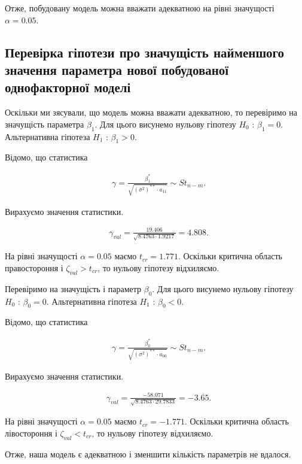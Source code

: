 \documentclass[14pt,a4paper]{scrartcl}
\theoremstyle{definition}
\theoremstyle{remark}
\theoremstyle{definition}
\theoremstyle{definition}
\begin{document}
Отже, побудовану модель можна вважати адекватною на рівні значущості $\alpha = 0.05$.

\subsection{Перевірка гіпотези про значущість найменшого значення параметра нової побудованої однофакторної моделі}

Оскільки ми з\textquotesingle ясували, що модель можна вважати адекватною, то перевіримо на значущість параметра $\beta_{1}$. Для цього висунемо нульову гіпотезу $H_{0}$ : $\beta_{1} = 0$. Альтернативна гіпотеза $H_{1}$ : $\beta_{1} > 0$.

Відомо, що статистика

\begin{align*}
  & \gamma = \frac{\beta_{1}^{*}}{\sqrt{(\sigma^2)^{**}\cdot a_{11}}} \sim St_{n - m}.
\end{align*}

Вирахуємо значення статистики.

\begin{align*}
  & \gamma_{val} = \frac{19.406}{\sqrt{8.4763 \cdot 1.9217}} = 4.808.
\end{align*}

На рівні значущості $\alpha = 0.05$ маємо $t_{cr} = 1.771$. Оскільки критична область правостороння і $\zeta_{val} > t_{cr}$, то нульову гіпотезу відхиляємо.

Перевіримо на значущість і параметр $\beta_{0}$. Для цього висунемо нульову гіпотезу $H_{0}$ : $\beta_{0} = 0$. Альтернативна гіпотеза $H_{1}$ : $\beta_{0} < 0$.

Відомо, що статистика

\begin{align*}
  & \gamma = \frac{\beta_{0}^{*}}{\sqrt{(\sigma^2)^{**}\cdot a_{00}}} \sim St_{n - m}.
\end{align*}

Вирахуємо значення статистики.

\begin{align*}
  & \gamma_{val} = \frac{-58.071}{\sqrt{8.4763 \cdot 29.7833}} = -3.65.
\end{align*}

На рівні значущості $\alpha = 0.05$ маємо $t_{cr} = -1.771$. Оскільки критична область лівостороння і $\zeta_{val} < t_{cr}$, то нульову гіпотезу відхиляємо.

Отже, наша модель є адекватною і зменшити кількість параметрів не вдалося.
\end{document}
